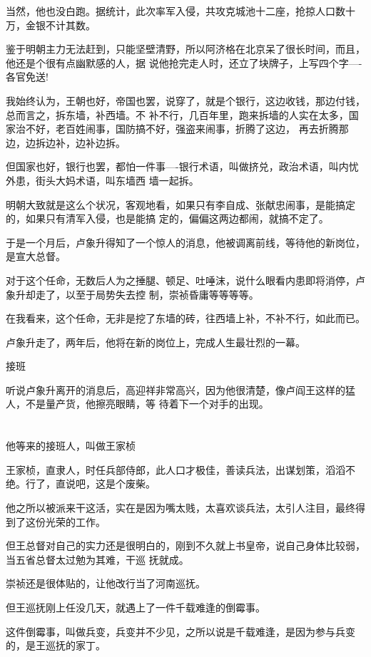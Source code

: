 \documentclass[11pt,a4paper,onecolumn]{article}
\begin{document}
当然，他也没白跑。据统计，此次率军入侵，共攻克城池十二座，抢掠人口数十万，金银不计其数。

鉴于明朝主力无法赶到，只能坚壁清野，所以阿济格在北京呆了很长时间，而且，他还是个很有点幽默感的人，据
说他抢完走人时，还立了块牌子，上写四个字----各官免送!

我始终认为，王朝也好，帝国也罢，说穿了，就是个银行，这边收钱，那边付钱，总而言之，拆东墙，补西墙。不
补不行，几百年里，跑来拆墙的人实在太多，国家治不好，老百姓闹事，国防搞不好，强盗来闹事，折腾了这边，
再去折腾那边，边拆边补，边补边拆。

但国家也好，银行也罢，都怕一件事----银行术语，叫做挤兑，政治术语，叫内忧外患，街头大妈术语，叫东墙西
墙一起拆。

明朝大致就是这么个状况，客观地看，如果只有李自成、张献忠闹事，是能搞定的，如果只有清军入侵，也是能搞
定的，偏偏这两边都闹，就搞不定了。

于是一个月后，卢象升得知了一个惊人的消息，他被调离前线，等待他的新岗位，是宣大总督。

对于这个任命，无数后人为之捶腿、顿足、吐唾沫，说什么眼看内患即将消停，卢象升却走了，以至于局势失去控
制，崇祯昏庸等等等等。

在我看来，这个任命，无非是挖了东墙的砖，往西墙上补，不补不行，如此而已。

卢象升走了，两年后，他将在新的岗位上，完成人生最壮烈的一幕。

接班

听说卢象升离开的消息后，高迎祥非常高兴，因为他很清楚，像卢阎王这样的猛人，不是量产货，他擦亮眼睛，等
待着下一个对手的出现。

\section[\thesection]{}

他等来的接班人，叫做王家桢

王家桢，直隶人，时任兵部侍郎，此人口才极佳，善读兵法，出谋划策，滔滔不绝。行了，直说吧，这是个废柴。

他之所以被派来干这活，实在是因为嘴太贱，太喜欢谈兵法，太引人注目，最终得到了这份光荣的工作。

但王总督对自己的实力还是很明白的，刚到不久就上书皇帝，说自己身体比较弱，当五省总督太过勉为其难，干巡
抚就成。

崇祯还是很体贴的，让他改行当了河南巡抚。

但王巡抚刚上任没几天，就遇上了一件千载难逢的倒霉事。

这件倒霉事，叫做兵变，兵变并不少见，之所以说是千载难逢，是因为参与兵变的，是王巡抚的家丁。
\end{document}
